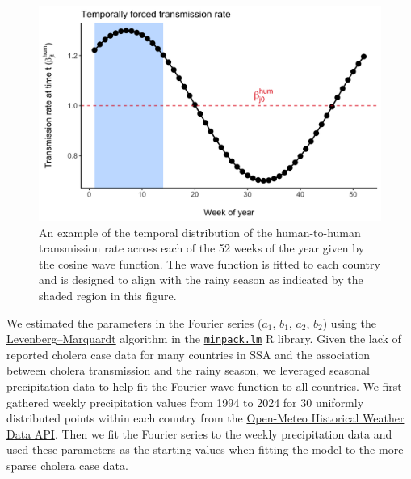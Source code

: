 \documentclass[
]{book}
\begin{document}
\begin{figure}

{\centering \includegraphics[width=0.85\linewidth]{figures/seasonal_transmission_concept} 

}

\caption{An example of the temporal distribution of the human-to-human transmission rate across each of the 52 weeks of the year given by the cosine wave function. The wave function is fitted to each country and is designed to align with the rainy season as indicated by the shaded region in this figure.}\label{fig:seasonal-concept}
\end{figure}

We estimated the parameters in the Fourier series (\(a_1\), \(b_1\), \(a_2\), \(b_2\)) using the \href{https://en.wikipedia.org/wiki/Levenberg\%E2\%80\%93Marquardt_algorithm}{Levenberg--Marquardt} algorithm in the \href{https://rdrr.io/cran/minpack.lm/}{\texttt{minpack.lm}} R library. Given the lack of reported cholera case data for many countries in SSA and the association between cholera transmission and the rainy season, we leveraged seasonal precipitation data to help fit the Fourier wave function to all countries. We first gathered weekly precipitation values from 1994 to 2024 for 30 uniformly distributed points within each country from the \href{https://open-meteo.com/en/docs/historical-weather-api}{Open-Meteo Historical Weather Data API}. Then we fit the Fourier series to the weekly precipitation data and used these parameters as the starting values when fitting the model to the more sparse cholera case data.
\end{document}
